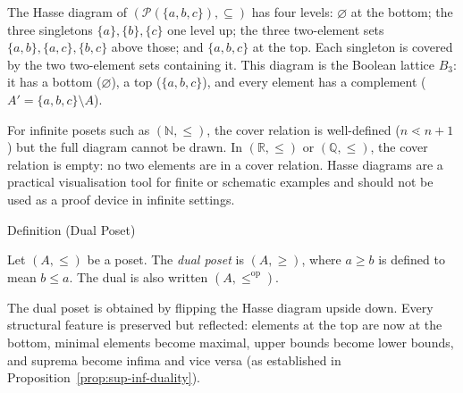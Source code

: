\begin{example*}
\label{ex:hasse-power-set}
The Hasse diagram of $(\mathcal{P}(\{a,b,c\}), \subseteq)$ has four levels:
$\varnothing$ at the bottom; the three singletons $\{a\},\{b\},\{c\}$ one
level up; the three two-element sets $\{a,b\},\{a,c\},\{b,c\}$ above those;
and $\{a,b,c\}$ at the top.  Each singleton is covered by the two two-element
sets containing it.  This diagram is the Boolean lattice $B_3$: it has a
bottom ($\varnothing$), a top ($\{a,b,c\}$), and every element has a complement
($A' = \{a,b,c\} \setminus A$).
\end{example*}

\begin{remark*}
\label{rem:hasse-infinite}
For infinite posets such as $(\mathbb{N}, \leq)$, the cover relation is
well-defined ($n \lessdot n+1$) but the full diagram cannot be drawn.  In
$(\mathbb{R}, \leq)$ or $(\mathbb{Q}, \leq)$, the cover relation is empty:
no two elements are in a cover relation.  Hasse diagrams are a practical
visualisation tool for finite or schematic examples and should not be used
as a proof device in infinite settings.
\end{remark*}


\begin{definitionbox}{Definition (Dual Poset)}
\begin{definition}\label{def:dual-poset}
Let $(A, \leq)$ be a poset.  The \emph{dual poset} is $(A, \geq)$, where
$a \geq b$ is defined to mean $b \leq a$.  The dual is also written
$(A, \leq^{\mathrm{op}})$.
\end{definition}
\end{definitionbox}

\begin{remark*}[Intuition]
\label{rem:dual-intuition}
The dual poset is obtained by flipping the Hasse diagram upside down.  Every
structural feature is preserved but reflected: elements at the top are now at
the bottom, minimal elements become maximal, upper bounds become lower bounds,
and suprema become infima and vice versa (as established in
Proposition~\ref{prop:sup-inf-duality}).
\end{remark*}


